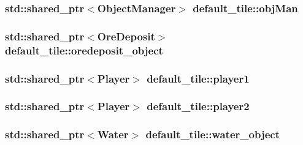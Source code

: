 \hypertarget{classdefault__tile_a8749ee4ac9c528916c2fd835ce14f043}{
\subsubsection[{obj\-Man}]{\setlength{\rightskip}{0pt plus 5cm}std\-::shared\-\_\-ptr$<${\bf Object\-Manager}$>$ default\-\_\-tile\-::obj\-Man\hspace{0.3cm}{\ttfamily [private]}}}\label{classdefault__tile_a8749ee4ac9c528916c2fd835ce14f043}
\hypertarget{classdefault__tile_a267580dfeea7352f56f5bd106def49c5}{
\subsubsection[{oredeposit\-\_\-object}]{\setlength{\rightskip}{0pt plus 5cm}std\-::shared\-\_\-ptr$<${\bf Ore\-Deposit}$>$ default\-\_\-tile\-::oredeposit\-\_\-object\hspace{0.3cm}{\ttfamily [private]}}}\label{classdefault__tile_a267580dfeea7352f56f5bd106def49c5}
\hypertarget{classdefault__tile_adeba3a9d85b478d7cd0dbd5b6194ede3}{
\subsubsection[{player1}]{\setlength{\rightskip}{0pt plus 5cm}std\-::shared\-\_\-ptr$<${\bf Player}$>$ default\-\_\-tile\-::player1\hspace{0.3cm}{\ttfamily [private]}}}\label{classdefault__tile_adeba3a9d85b478d7cd0dbd5b6194ede3}
\hypertarget{classdefault__tile_ad7407fc63175dce0d369ddcc261194a6}{
\subsubsection[{player2}]{\setlength{\rightskip}{0pt plus 5cm}std\-::shared\-\_\-ptr$<${\bf Player}$>$ default\-\_\-tile\-::player2\hspace{0.3cm}{\ttfamily [private]}}}\label{classdefault__tile_ad7407fc63175dce0d369ddcc261194a6}
\hypertarget{classdefault__tile_a083dbfdbbd2f789667ce742cb26afe83}{
\subsubsection[{water\-\_\-object}]{\setlength{\rightskip}{0pt plus 5cm}std\-::shared\-\_\-ptr$<${\bf Water}$>$ default\-\_\-tile\-::water\-\_\-object\hspace{0.3cm}{\ttfamily [private]}}}\label{classdefault__tile_a083dbfdbbd2f789667ce742cb26afe83}
